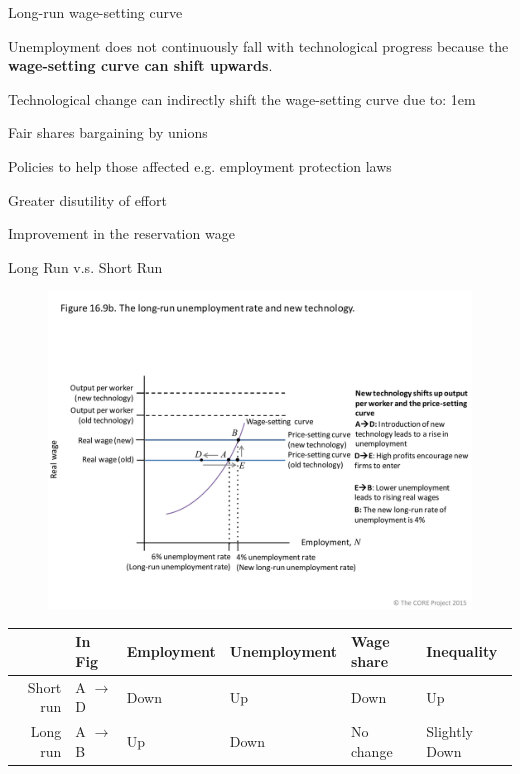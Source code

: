 \documentclass[11pt,aspectratio=43,usenames,dvipsnames]{beamer}
\let\olditemize=\itemize
\let\endolditemize=\enditemize
\renewenvironment{itemize}{\olditemize \itemsep1em}{\endolditemize}
\theoremstyle{definition}
\begin{document}
\begin{frame}{Long-run wage-setting curve}
\label{slide:Long_run_wage_setting_curve}
\begin{center}
Unemployment does not continuously fall with technological progress because the \textbf{wage-setting curve can shift upwards}.
\end{center}

Technological change can indirectly shift the wage-setting curve due to:
\begin{itemize}
    \item Fair shares bargaining by unions
    \item Policies to help those affected e.g. employment protection laws
    \item Greater disutility of effort
    \item Improvement in the reservation wage
\end{itemize}

\end{frame}

\begin{frame}{Long Run v.s. Short Run}
\label{slide:Long_Run_v_s__Short_Run}
    \begin{figure}
        \centering
        \includegraphics[trim={0cm 2cm 0cm 5cm}, clip, width=\textwidth]{./figures/11.pdf}
    \end{figure}

    \footnotesize
    \begin{tabular}{rlllll}
        \toprule
            & In Fig
            & Employment
            & Unemployment
            & Wage share
            & Inequality
        \\
        \hline
        \hline
        Short run
            & A $ \rightarrow  $ D
            & Down
            & Up
            & Down
            & Up
        \\
        \hline
        Long run
            & A $ \rightarrow  $ B
            & Up
            & Down
            & No change
            & Slightly Down
        \\
        \bottomrule
    \end{tabular}
    \normalsize

\end{frame}
\end{document}

